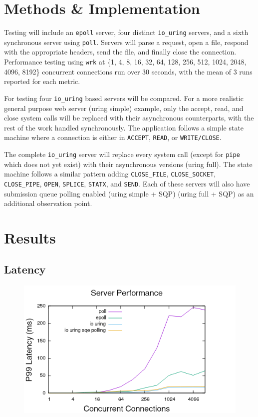 \documentclass[letterpaper, 10pt, twocolumn]{article}
\begin{document}
\section{Methods \& Implementation}
\label{sec:org7f756be}
Testing will include an \texttt{epoll} server, four distinct \texttt{io\_uring} servers, and a sixth synchronous server using \texttt{poll}. Servers will parse a request, open a file, respond with the appropriate headers, send the file, and finally close the connection. Performance testing using \texttt{wrk} at \{1, 4, 8, 16, 32, 64, 128, 256, 512, 1024, 2048, 4096, 8192\} concurrent connections run over 30 seconds, with the mean of 3 runs reported for each metric.

For testing four \texttt{io\_uring} based servers will be compared. For a more realistic general purpose web server (uring simple) example, only the accept, read, and close system calls will be replaced with their asynchronous counterparts, with the rest of the work handled synchronously. The application follows a simple state machine where a connection is either in \texttt{ACCEPT}, \texttt{READ}, or \texttt{WRITE/CLOSE}.

The complete \texttt{io\_uring} server will replace every system call (except for \texttt{pipe} which does not yet exist) with their asynchronous versions (uring full). The state machine follows a similar pattern adding \texttt{CLOSE\_FILE}, \texttt{CLOSE\_SOCKET}, \texttt{CLOSE\_PIPE}, \texttt{OPEN}, \texttt{SPLICE}, \texttt{STATX}, and \texttt{SEND}. Each of these servers will also have submission queue polling enabled (uring simple + SQP) (uring full + SQP) as an additional observation point. 
\section{Results}
\label{sec:org2d7df7b}
\subsection{Latency}
\label{sec:orgc162b15}
\begin{figure}
\centering
\includegraphics[width=4.5in]{./p99_latency.png}
\end{figure}
\end{document}
